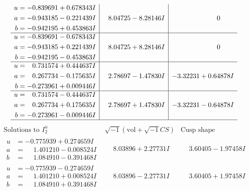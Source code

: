 \documentclass[1p]{elsarticle_modified}
\theoremstyle{definition}
\newcommand{\I}{\sqrt{-1}}
\begin{document}
$$\begin{array}{c|c|c}
\begin{aligned}
u &= -0.839691 + 0.678343 I \\
a &= -0.943185 - 0.221439 I \\
b &= -0.942195 + 0.453863 I\end{aligned}
 & \phantom{-}8.04725 - 8.28146 I & \phantom{-0.000000 } 0 \\ \hline\begin{aligned}
u &= -0.839691 - 0.678343 I \\
a &= -0.943185 + 0.221439 I \\
b &= -0.942195 - 0.453863 I\end{aligned}
 & \phantom{-}8.04725 + 8.28146 I & \phantom{-0.000000 } 0 \\ \hline\begin{aligned}
u &= \phantom{-}0.731574 + 0.444637 I \\
a &= \phantom{-}0.267734 - 0.175635 I \\
b &= -0.273961 + 0.009446 I\end{aligned}
 & \phantom{-}2.78697 - 1.47830 I & -3.32231 + 0.64878 I \\ \hline\begin{aligned}
u &= \phantom{-}0.731574 - 0.444637 I \\
a &= \phantom{-}0.267734 + 0.175635 I \\
b &= -0.273961 - 0.009446 I\end{aligned}
 & \phantom{-}2.78697 + 1.47830 I & -3.32231 - 0.64878 I\\
 \hline 
 \end{array}$$\newpage$$\begin{array}{c|c|c}  
\text{Solutions to }I^u_{2}& \I (\text{vol} + \sqrt{-1}CS) & \text{Cusp shape}\\
 \hline 
\begin{aligned}
u &= -0.775939 + 0.274659 I \\
a &= \phantom{-}1.401210 - 0.008524 I \\
b &= \phantom{-}1.084910 - 0.391468 I\end{aligned}
 & \phantom{-}8.03896 + 2.27731 I & \phantom{-}3.60405 - 1.97458 I \\ \hline\begin{aligned}
u &= -0.775939 - 0.274659 I \\
a &= \phantom{-}1.401210 + 0.008524 I \\
b &= \phantom{-}1.084910 + 0.391468 I\end{aligned}
 & \phantom{-}8.03896 - 2.27731 I & \phantom{-}3.60405 + 1.97458 I \\ \hline\begin{aligned}

\end{aligned}
\end{array}$$
\end{document}

